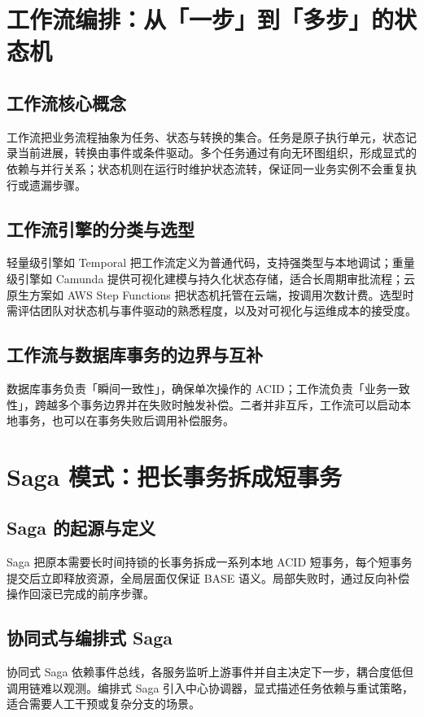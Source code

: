 \chapter{工作流编排：从「一步」到「多步」的状态机}
\section{工作流核心概念}
工作流把业务流程抽象为任务、状态与转换的集合。任务是原子执行单元，状态记录当前进展，转换由事件或条件驱动。多个任务通过有向无环图组织，形成显式的依赖与并行关系；状态机则在运行时维护状态流转，保证同一业务实例不会重复执行或遗漏步骤。\par
\section{工作流引擎的分类与选型}
轻量级引擎如 Temporal 把工作流定义为普通代码，支持强类型与本地调试；重量级引擎如 Camunda 提供可视化建模与持久化状态存储，适合长周期审批流程；云原生方案如 AWS Step Functions 把状态机托管在云端，按调用次数计费。选型时需评估团队对状态机与事件驱动的熟悉程度，以及对可视化与运维成本的接受度。\par
\section{工作流与数据库事务的边界与互补}
数据库事务负责「瞬间一致性」，确保单次操作的 ACID；工作流负责「业务一致性」，跨越多个事务边界并在失败时触发补偿。二者并非互斥，工作流可以启动本地事务，也可以在事务失败后调用补偿服务。\par
\chapter{Saga 模式：把长事务拆成短事务}
\section{Saga 的起源与定义}
Saga 把原本需要长时间持锁的长事务拆成一系列本地 ACID 短事务，每个短事务提交后立即释放资源，全局层面仅保证 BASE 语义。局部失败时，通过反向补偿操作回滚已完成的前序步骤。\par
\section{协同式与编排式 Saga}
协同式 Saga 依赖事件总线，各服务监听上游事件并自主决定下一步，耦合度低但调用链难以观测。编排式 Saga 引入中心协调器，显式描述任务依赖与重试策略，适合需要人工干预或复杂分支的场景。\par
